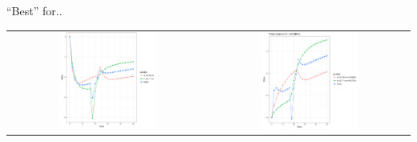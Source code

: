 \documentclass{beamer}
\begin{document}
\begin{frame}{``Best'' for..}
	\begin{table}
		\begin{tabular}{ cc }
			\includegraphics[width=0.5\textwidth]{multi_2_correction.png} &
			\includegraphics[width=0.5\textwidth]{multi_2_result.png} \\
		\end{tabular}
	\end{table}
\end{frame}
\end{document}
